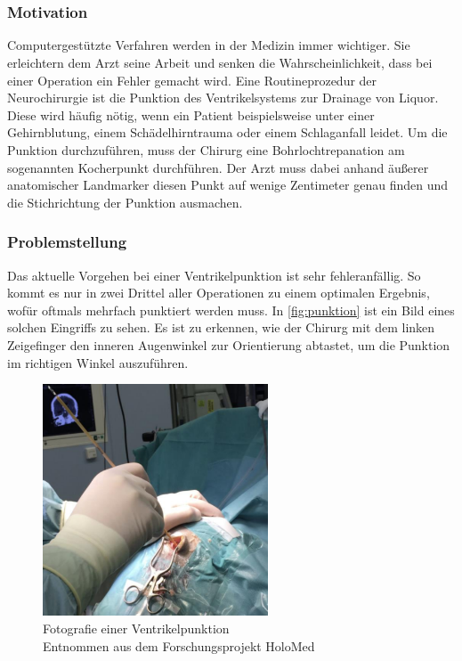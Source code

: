 \chapter{}
\label{sec:Introduction}

\subsection{Motivation}

Computergestützte Verfahren werden in der Medizin immer wichtiger. Sie erleichtern dem Arzt seine Arbeit und senken die Wahrscheinlichkeit, dass bei einer Operation ein Fehler gemacht wird.
\newline
Eine Routineprozedur der Neurochirurgie ist die Punktion des Ventrikelsystems zur Drainage von Liquor. Diese wird häufig nötig, wenn ein Patient beispielsweise unter einer Gehirnblutung, einem Schädelhirntrauma oder einem Schlaganfall leidet.
\newline
Um die Punktion durchzuführen, muss der Chirurg eine Bohrlochtrepanation am sogenannten Kocherpunkt durchführen. Der Arzt muss dabei anhand äußerer anatomischer Landmarker diesen Punkt auf wenige Zentimeter genau finden und die Stichrichtung der Punktion ausmachen.



\subsection{Problemstellung}

Das aktuelle Vorgehen bei einer Ventrikelpunktion ist sehr fehleranfällig. So kommt es nur in zwei Drittel aller Operationen zu einem optimalen Ergebnis, wofür oftmals mehrfach punktiert werden muss. In \autoref{fig:punktion} ist ein Bild eines solchen Eingriffs zu sehen. Es ist zu erkennen, wie der Chirurg mit dem linken Zeigefinger den inneren Augenwinkel zur Orientierung abtastet, um die Punktion im richtigen Winkel auszuführen.


\begin{figure}[!h] 
\centering 
\includegraphics[width=0.6\textwidth]{Logos/Punktion2.png}
\caption{Fotografie einer Ventrikelpunktion  \\ Entnommen aus dem Forschungsprojekt HoloMed \protect\cite{punktion}} 
\label{fig:punktion} 
\end{figure}




